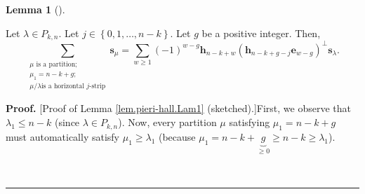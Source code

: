 \documentclass[numbers=enddot,12pt,final,onecolumn,notitlepage]{scrartcl}%
\theoremstyle{definition}
\newtheorem{lem}[theo]{Lemma}
\newenvironment{lemma}[1][]
{\begin{lem}[#1]\begin{leftbar}}
{\end{leftbar}\end{lem}}
\newenvironment{proof}[1][Proof]{\noindent\textbf{#1.} }{\ \rule{0.5em}{0.5em}}
\let\sumnonlimits\sum
\renewcommand{\sum}{\sumnonlimits\limits}
\begin{document}
\begin{lemma}
\label{lem.pieri-hall.Lam1}Let $\lambda\in P_{k,n}$. Let $j\in\left\{
0,1,\ldots,n-k\right\}  $. Let $g$ be a positive integer. Then,%
\[
\sum_{\substack{\mu\text{ is a partition;}\\\mu_{1}=n-k+g;\\\mu/\lambda\text{
is a horizontal }j\text{-strip}}}\mathbf{s}_{\mu}=\sum_{w\geq1}\left(
-1\right)  ^{w-g}\mathbf{h}_{n-k+w}\left(  \mathbf{h}_{n-k+g-j}\mathbf{e}%
_{w-g}\right)  ^{\perp}\mathbf{s}_{\lambda}.
\]

\end{lemma}

\begin{proof}
[Proof of Lemma \ref{lem.pieri-hall.Lam1} (sketched).]First, we observe that
$\lambda_{1}\leq n-k$ (since $\lambda\in P_{k,n}$). Now, every partition $\mu$
satisfying $\mu_{1}=n-k+g$ must automatically satisfy $\mu_{1}\geq\lambda_{1}$
(because $\mu_{1}=n-k+\underbrace{g}_{\geq0}\geq n-k\geq\lambda_{1}$).


\end{proof}
\end{document}
